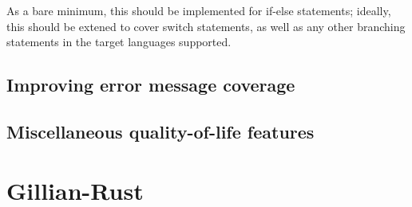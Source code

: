 As a bare minimum, this should be implemented for if-else statements; ideally,
this should be extened to cover switch statements, as well as any other
branching statements in the target languages supported.


\subsection{Improving error message coverage}

\subsection{Miscellaneous quality-of-life features}

\section{Gillian-Rust}

